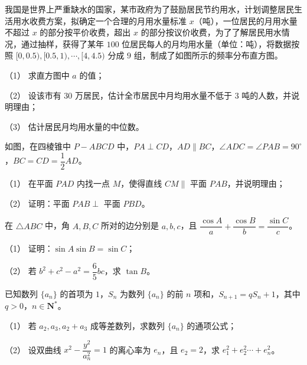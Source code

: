 \Needspace{0.4\textheight}
\begin{question}
我国是世界上严重缺水的国家，某市政府为了鼓励居民节约用水，计划调整居民生活用水收费方案，拟确定一个合理的月用水量标准 \(x\)（吨），一位居民的月用水量不超过 \(x\) 的部分按平价收费，超出 \(x\) 的部分按议价收费，为了了解居民用水情况，通过抽样，获得了某年 \(100\) 位居民每人的月均用水量（单位：吨），将数据按照 \([0,0.5),[0.5,1),\cdots,[4,4.5)\) 分成 \(9\) 组，制成了如图所示的频率分布直方图。
\nopagebreak[4]
\begin{center}\end{center}
\nopagebreak[4]
（1） 求直方图中 \(a\) 的值；

（2） 设该市有 \(30\) 万居民，估计全市居民中月均用水量不低于 \(3\) 吨的人数，并说明理由；

（3） 估计居民月均用水量的中位数。

\Needspace{0.4\textheight}
\end{question}
\begin{question}
如图，在四棱锥中 \(P-ABCD\) 中，\(PA\perp CD\)，\(AD\parallel BC\)，\(\angle ADC=\angle PAB=90^{\circ}\)，\(BC=CD=\dfrac{1}{2}AD\)。
\nopagebreak[4]
\begin{center}\end{center}
\nopagebreak[4]
（1） 在平面 \(PAD\) 内找一点 \(M\)，使得直线 \(CM\parallel\) 平面 \(PAB\)，并说明理由；

（2） 证明：平面 \(PAB\perp\) 平面 \(PBD\)。

\end{question}
\begin{question}
在 \(\triangle ABC\) 中，角 \(A,B,C\) 所对的边分别是 \(a,b,c\)，且 \(\dfrac{\cos A}{a}+\dfrac{\cos B}{b}=\dfrac{\sin C}{c}\)。

（1） 证明：\(\sin A\sin B=\sin C\)；

（2） 若 \(b^{2}+c^{2}-a^{2}=\dfrac{6}{5}bc\)，求 \(\tan B\)。

\end{question}
\begin{question}
已知数列 \(\{a_{n}\}\) 的首项为 \(1\)，\(S_{n}\) 为数列 \(\{a_{n}\}\) 的前 \(n\) 项和，\(S_{n+1}=qS_{n}+1\)，其中 \(q>0\)，\(n\in\mathbf{N}^{*}\)。

（1） 若 \(a_{2},a_{3},a_{2}+a_{3}\) 成等差数列，求数列 \(\{a_{n}\}\) 的通项公式；

（2） 设双曲线 \(x^{2}-\dfrac{y^{2}}{a_{n}^{2}}=1\) 的离心率为 \(e_{n}\)，且 \(e_{2}=2\)，求 \(e_{1}^{2}+e_{2}^{2}\cdots+e_{n}^{2}\)。

\end{question}

